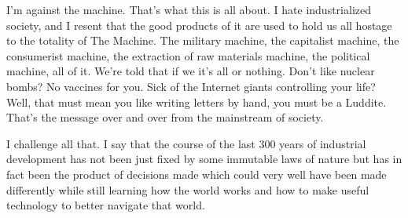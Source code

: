 I'm against the machine. That's what this is all about. I hate
industrialized society, and I resent that the good products of it are
used to hold us all hostage to the totality of The Machine. The military
machine, the capitalist machine, the consumerist machine, the extraction
of raw materials machine, the political machine, all of it. We're told
that if we it's all or nothing. Don't like nuclear bombs? No vaccines
for you. Sick of the Internet giants controlling your life? Well, that
must mean you like writing letters by hand, you must be a Luddite.
That's the message over and over from the mainstream of society.

I challenge all that. I say that the course of the last 300 years of
industrial development has not been just fixed by some immutable laws of
nature but has in fact been the product of decisions made which could
very well have been made differently while still learning how the world
works and how to make useful technology to better navigate that world.
